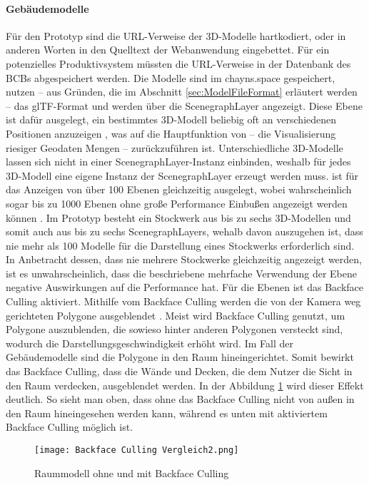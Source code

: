 \paragraph{Gebäudemodelle}
Für den Prototyp sind die \ac{URL}-Verweise der 3D-Modelle hartkodiert, oder in anderen Worten in den Quelltext der Webanwendung eingebettet. Für ein potenzielles Produktivsystem müssten die \ac{URL}-Verweise in der Datenbank des \ac{BCB}s abgespeichert werden. Die Modelle sind im chayns.space gespeichert, nutzen – aus Gründen, die im Abschnitt \ref{sec:ModelFileFormat} erläutert werden – das \ac{glTF}-Format und werden über die ScenegraphLayer angezeigt. Diese Ebene ist dafür ausgelegt, ein bestimmtes 3D-Modell beliebig oft an verschiedenen Positionen anzuzeigen \cite{DeckglScenegraphLayer}, was auf die Hauptfunktion von \deckgl{} – die Visualisierung riesiger Geodaten Mengen \cite[S.~3]{YangWang2019} – zurückzuführen ist. Unterschiedliche 3D-Modelle lassen sich nicht in einer ScenegraphLayer-Instanz einbinden, weshalb für jedes 3D-Modell eine eigene Instanz der ScenegraphLayer erzeugt werden muss. \deckgl{} ist für das Anzeigen von über 100 Ebenen gleichzeitig ausgelegt, wobei wahrscheinlich sogar bis zu 1000 Ebenen ohne große Performance Einbußen angezeigt werden können \cite{DeckglPerformance}. Im Prototyp besteht ein Stockwerk aus bis zu sechs 3D-Modellen und somit auch aus bis zu sechs ScenegraphLayers, wehalb davon auszugehen ist, dass nie mehr als 100 Modelle für die Darstellung eines Stockwerks erforderlich sind. In Anbetracht dessen, dass nie mehrere Stockwerke gleichzeitig angezeigt werden, ist es unwahrscheinlich, dass die beschriebene mehrfache Verwendung der Ebene negative Auswirkungen auf die Performance hat. Für die Ebenen ist das Backface Culling aktiviert. Mithilfe vom Backface Culling werden die von der Kamera weg gerichteten Polygone ausgeblendet \cite{BackfaceCulling}. Meist wird Backface Culling genutzt, um Polygone auszublenden, die sowieso hinter anderen Polygonen versteckt sind, wodurch die Darstellungsgeschwindigkeit erhöht wird. Im Fall der Gebäudemodelle sind die Polygone in den Raum hineingerichtet. Somit bewirkt das Backface Culling, dass die Wände und Decken, die dem Nutzer die Sicht in den Raum verdecken, ausgeblendet werden. In der Abbildung \ref{fig:BackfaceCulling} wird dieser Effekt deutlich. So sieht man oben, dass ohne das Backface Culling nicht von außen in den Raum hineingesehen werden kann, während es unten mit aktiviertem Backface Culling möglich ist.

\begin{figure}[H]
    \caption{Raummodell ohne und mit Backface Culling}\label{fig:BackfaceCulling}
    \texttt{[image: Backface Culling Vergleich2.png]}
\end{figure}

